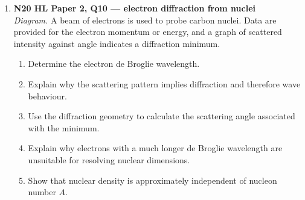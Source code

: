\documentclass[11pt]{article}
\begin{document}
\begin{enumerate}[leftmargin=*, itemsep=1.1em]
\item \textbf{N20 HL Paper 2, Q10 --- electron diffraction from nuclei}\\
\textit{Diagram.} A beam of electrons is used to probe carbon nuclei. Data are provided for the electron momentum or energy, and a graph of scattered intensity against angle indicates a diffraction minimum.
\begin{enumerate}[label=(\alph*)]
\item Determine the electron de Broglie wavelength.
\item Explain why the scattering pattern implies diffraction and therefore wave behaviour.
\item Use the diffraction geometry to calculate the scattering angle associated with the minimum.
\item Explain why electrons with a much longer de Broglie wavelength are unsuitable for resolving nuclear dimensions.
\item Show that nuclear density is approximately independent of nucleon number $A$.
\end{enumerate}

\end{enumerate}
\end{document}
